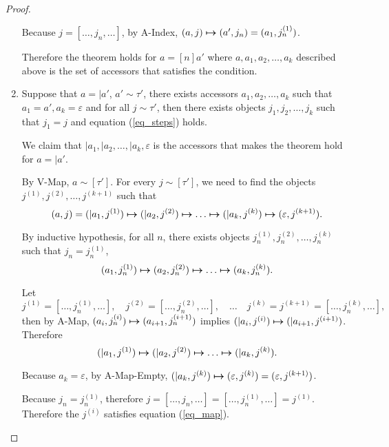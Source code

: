 \documentclass[11pt]{article}
\newcommand{\matches}[2]{{#1}\sim{#2}}   %
\begin{document}
\begin{proof}
\begin{enumerate}
          Because \(j=[\dots,j_n,\dots]\), by A-Index, \((a,j) \boldsymbol{\mapsto} (a',j_n)=(a_1,j_n^{(1)})\).

          Therefore the theorem holds for \(a=[n]a'\) where \(a, a_1, a_2, \ldots, a_k\) described above is the set of accessors that satisfies the condition.

    \item Suppose that \(a=|a'\), \(\matches{a'}{\tau'}\), there exists accessors \(a_1, a_2, \ldots, a_k\) such that \(a_1 = a', a_k = \varepsilon\) and for all \(\matches{j}{\tau'}\), then there exists objects \(j_1, j_2, \ldots, j_k\) such that \(j_1=j\) and equation (\ref{eq_steps}) holds.
    
          We claim that \(|a_1, |a_2, \ldots, |a_k, \varepsilon\) is the accessors that makes the theorem hold for \(a=|a'\).

          By V-Map, \(\matches{a}{[\tau']}\). For every \(\matches{j}{[\tau']}\), we need to find the objects \(j^{(1)},j^{(2)},\ldots,j^{(k+1)}\) such that
          \begin{equation}\label{eq_map}
            (a,j)=(|a_1,j^{(1)}) \boldsymbol{\mapsto}(|a_2,j^{(2)}) \boldsymbol{\mapsto}\ldots\boldsymbol{\mapsto} (|a_k,j^{(k)})\boldsymbol{\mapsto} (\varepsilon,j^{(k+1)}).
          \end{equation}

          By inductive hypothesis, for all \(n\), there exists objects \(j_{n}^{(1)},j_{n}^{(2)},\ldots,j_{n}^{(k)}\) such that \(j_{n}=j_{n}^{(1)}\),
          \[(a_1,j_{n}^{(1)}) \boldsymbol{\mapsto}(a_2,j_{n}^{(2)}) \boldsymbol{\mapsto}\ldots\boldsymbol{\mapsto} (a_k,j_{n}^{(k)}).\]

          Let
          \[j^{(1)}=[\ldots,j_n^{(1)},\ldots],\quad j^{(2)}=[\ldots,j_n^{(2)},\ldots],\quad\ldots\quad j^{(k)}=j^{(k+1)}=[\ldots,j_n^{(k)},\ldots],\]
          then by A-Map, \((a_i,j_{n}^{(i)}) \boldsymbol{\mapsto} (a_{i+1},j_{n}^{(i+1)})\) implies \((|a_i,j^{(i)}) \boldsymbol{\mapsto} (|a_{i+1},j^{(i+1)})\). Therefore
          \[(|a_1,j^{(1)}) \boldsymbol{\mapsto}(|a_2,j^{(2)}) \boldsymbol{\mapsto}\ldots\boldsymbol{\mapsto} (|a_k,j^{(k)}).\]

          Because \(a_k=\varepsilon\), by A-Map-Empty, \((|a_k,j^{(k)}) \boldsymbol{\mapsto} (\varepsilon,j^{(k)})=(\varepsilon,j^{(k+1)})\).

          Because \(j_{n}=j_{n}^{(1)}\), therefore \(j=[\ldots,j_n,\ldots]=[\ldots,j_n^{(1)},\ldots]=j^{(1)}\). Therefore the \(j^{(i)}\) satisfies equation (\ref{eq_map}).\qedhere
  \end{enumerate}
\end{proof}
\end{document}

